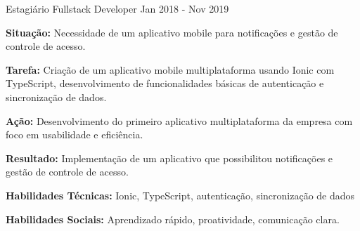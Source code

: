 \begin{cventries}
    
    \cventry
    {Estagiário Fullstack Developer} %
    {} %
    {} %
    {Jan 2018 - Nov 2019} %
    {
      \begin{cvitems} %
        \item {\textbf{Situação:} Necessidade de um aplicativo mobile para notificações e gestão de controle de acesso.}
        \item {\textbf{Tarefa:} Criação de um aplicativo mobile multiplataforma usando Ionic com TypeScript, desenvolvimento de funcionalidades básicas de autenticação e sincronização de dados.}
        \item {\textbf{Ação:} Desenvolvimento do primeiro aplicativo multiplataforma da empresa com foco em usabilidade e eficiência.}
        \item {\textbf{Resultado:} Implementação de um aplicativo que possibilitou notificações e gestão de controle de acesso.}
        \item {\textbf{Habilidades Técnicas:} Ionic, TypeScript, autenticação, sincronização de dados}
        \item {\textbf{Habilidades Sociais:} Aprendizado rápido, proatividade, comunicação clara.}
      \end{cvitems}
    }
\end{cventries}
